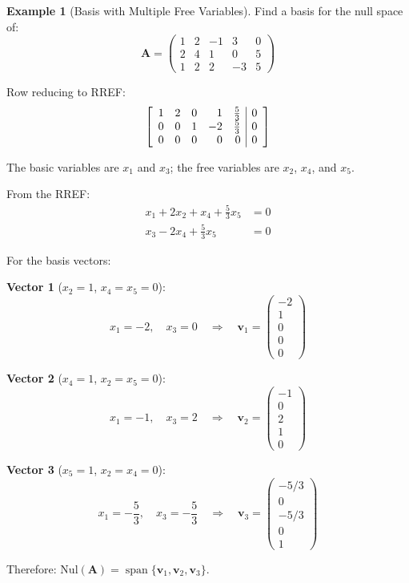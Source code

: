 \documentclass[12pt]{article}
\numberwithin{equation}{section}
\newcommand{\vect}[1]{\boldsymbol{#1}}   %
\newcommand{\mat}[1]{\mathbf{#1}}        %
\newcommand{\Span}{\operatorname{span}}
\newenvironment{amatrix}[1]{%
  \left[\begin{array}{#1}}
  {\end{array}\right]}
\theoremstyle{plain}
\theoremstyle{definition}
\newtheorem{example}[theorem]{Example}
\theoremstyle{remark}
\begin{document}
\begin{example}[Basis with Multiple Free Variables]
Find a basis for the null space of:
$$\mat{A} = \begin{pmatrix}
1 & 2 & -1 & 3 & 0\\
2 & 4 & 1 & 0 & 5\\
1 & 2 & 2 & -3 & 5
\end{pmatrix}$$

Row reducing to RREF:
$$\begin{amatrix}{rrrrr|r}
1 & 2 & 0 & 1 & \frac{5}{3} & 0\\
0 & 0 & 1 & -2 & \frac{5}{3} & 0\\
0 & 0 & 0 & 0 & 0 & 0
\end{amatrix}$$

The basic variables are $x_1$ and $x_3$; the free variables are $x_2$, $x_4$, and $x_5$.

From the RREF:
\begin{align}
x_1 + 2x_2 + x_4 + \frac{5}{3}x_5 &= 0\\
x_3 - 2x_4 + \frac{5}{3}x_5 &= 0
\end{align}

For the basis vectors:

\textbf{Vector 1} ($x_2 = 1$, $x_4 = x_5 = 0$):
$$x_1 = -2, \quad x_3 = 0 \quad \Rightarrow \quad \vect{v}_1 = \begin{pmatrix} -2 \\ 1 \\ 0 \\ 0 \\ 0 \end{pmatrix}$$

\textbf{Vector 2} ($x_4 = 1$, $x_2 = x_5 = 0$):
$$x_1 = -1, \quad x_3 = 2 \quad \Rightarrow \quad \vect{v}_2 = \begin{pmatrix} -1 \\ 0 \\ 2 \\ 1 \\ 0 \end{pmatrix}$$

\textbf{Vector 3} ($x_5 = 1$, $x_2 = x_4 = 0$):
$$x_1 = -\frac{5}{3}, \quad x_3 = -\frac{5}{3} \quad \Rightarrow \quad \vect{v}_3 = \begin{pmatrix} -5/3 \\ 0 \\ -5/3 \\ 0 \\ 1 \end{pmatrix}$$

Therefore: $\text{Nul}(\mat{A}) = \Span\{\vect{v}_1, \vect{v}_2, \vect{v}_3\}$.
\end{example}
\end{document}
